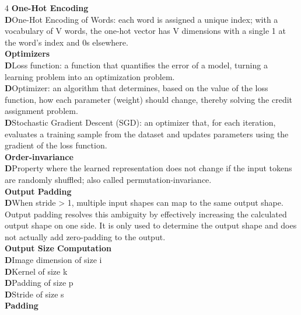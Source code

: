\documentclass[8pt]{extarticle}
\newcommand{\dtag}{\textcolor{definitioncolor}{\tiny\textbf{D}}\;}
\begin{document}
\begin{multicols}{4}
\vspace{2pt}\textbf{One-Hot Encoding}\\
\dtag One-Hot Encoding of Words: each word is assigned a unique index; with a vocabulary of V words, the one-hot vector has V dimensions with a single 1 at the word's index and 0s elsewhere.\\
\vspace{2pt}\textbf{Optimizers}\\
\dtag Loss function: a function that quantifies the error of a model, turning a learning problem into an optimization problem.\\
\dtag Optimizer: an algorithm that determines, based on the value of the loss function, how each parameter (weight) should change, thereby solving the credit assignment problem.\\
\dtag Stochastic Gradient Descent (SGD): an optimizer that, for each iteration, evaluates a training sample from the dataset and updates parameters using the gradient of the loss function.\\
\vspace{2pt}\textbf{Order-invariance}\\
\dtag Property where the learned representation does not change if the input tokens are randomly shuffled; also called permutation-invariance.\\
\vspace{2pt}\textbf{Output Padding}\\
\dtag When stride > 1, multiple input shapes can map to the same output shape. Output padding resolves this ambiguity by effectively increasing the calculated output shape on one side. It is only used to determine the output shape and does not actually add zero-padding to the output.\\
\vspace{2pt}\textbf{Output Size Computation}\\
\dtag Image dimension of size i\\
\dtag Kernel of size k\\
\dtag Padding of size p\\
\dtag Stride of size s\\
\vspace{2pt}\textbf{Padding}\\


\end{multicols}
\end{document}
